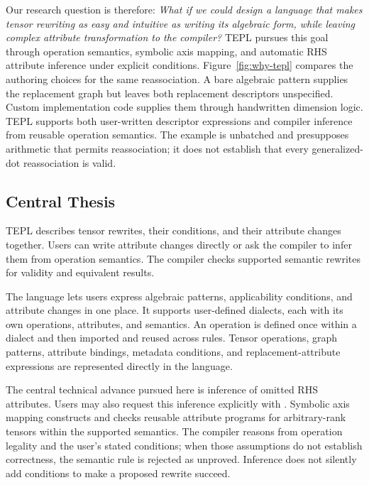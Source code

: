 Our research question is therefore: \emph{What if we could design a language
that makes tensor rewriting as easy and intuitive as writing its algebraic
form, while leaving complex attribute transformation to the compiler?}
TEPL pursues this goal through operation semantics, symbolic axis mapping,
and automatic RHS attribute inference under explicit conditions.
Figure~\ref{fig:why-tepl} compares the authoring choices for the same
reassociation. A bare algebraic pattern supplies the replacement graph but
leaves both replacement descriptors unspecified. Custom implementation code
supplies them through handwritten dimension logic. TEPL supports both
user-written descriptor expressions and compiler inference from reusable
operation semantics. The example is unbatched and presupposes arithmetic
that permits reassociation; it does not establish that every generalized-dot
reassociation is valid.


\FloatBarrier
\subsection{Central Thesis}
TEPL describes tensor rewrites, their conditions, and their attribute changes
together. Users can write attribute changes directly or ask the compiler to
infer them from operation semantics. The compiler checks supported semantic
rewrites for validity and equivalent results.

The language lets users express algebraic patterns, applicability conditions,
and attribute changes in one place. It supports user-defined dialects, each
with its own operations, attributes, and semantics. An operation is defined
once within a dialect and then imported and reused across rules. Tensor
operations, graph patterns, attribute bindings, metadata conditions, and
replacement-attribute expressions are represented directly in the language.

The central technical advance pursued here is inference of omitted RHS
attributes. Users may also request this inference explicitly with
. Symbolic axis mapping constructs and checks reusable attribute
programs for arbitrary-rank tensors within the supported semantics. The
compiler reasons from operation legality and the user's stated conditions;
when those assumptions do not establish correctness, the semantic rule is
rejected as unproved. Inference does not silently add conditions to make a
proposed rewrite succeed.

